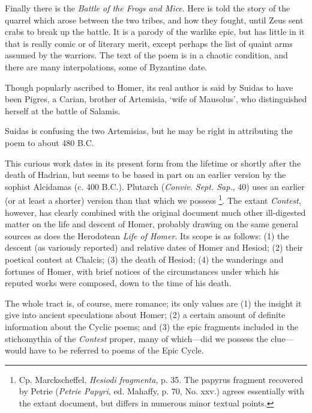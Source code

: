 Finally there is the \emph{Battle of the Frogs and Mice}. Here is told the
story of the quarrel which arose between the two tribes, and how they fought,
until Zeus sent crabs to break up the battle. It is a parody of the warlike
epic, but has little in it that is really comic or of literary merit, except
perhaps the list of quaint arms assumed by the warriors. The text of the poem
is in a chaotic condition, and there are many interpolations, some of Byzantine
date.

Though popularly ascribed to Homer, its real author is said by Suidas to have
been Pigres, a Carian, brother of Artemisia, ‘wife of Mausolus’,
who distinguished herself at the battle of Salamis.

Suidas is confusing the two Artemisias, but he may be right in attributing the
poem to about 480 B.C.


This curious work dates in its present form from the lifetime or shortly after
the death of Hadrian, but seems to be based in part on an earlier version by
the sophist Alcidamas (c. 400 B.C.). Plutarch (\emph{Conviv. Sept. Sap.}, 40)
uses an earlier (or at least a shorter) version than that which we possess \footnote{Cp. Marckscheffel,
\emph{Hesiodi fragmenta}, p. 35. The papyrus fragment recovered by Petrie
(\emph{Petrie Papyri}, ed. Mahaffy, p. 70, No. xxv.) agrees essentially with
the extant document, but differs in numerous minor textual points.}. The extant \emph{Contest},
however, has clearly combined with the original document much other
ill-digested matter on the life and descent of Homer, probably drawing on the
same general sources as does the Herodotean \emph{Life of Homer}. Its scope is
as follows: (1) the descent (as variously reported) and relative dates of Homer
and Hesiod; (2) their poetical contest at Chalcis; (3) the death of Hesiod; (4)
the wanderings and fortunes of Homer, with brief notices of the circumstances
under which his reputed works were composed, down to the time of his death.

The whole tract is, of course, mere romance; its only values are (1) the
insight it give into ancient speculations about Homer; (2) a certain amount of
definite information about the Cyclic poems; and (3) the epic fragments
included in the stichomythia of the \emph{Contest} proper, many of
which—did we possess the clue—would have to be referred to poems of
the Epic Cycle.


